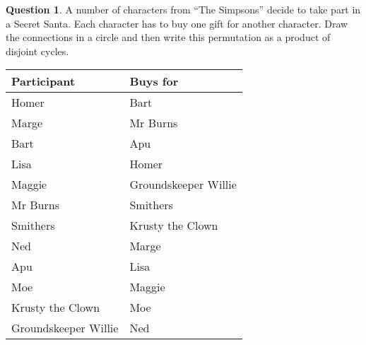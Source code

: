 \documentclass[a4paper,12pt]{article}
\theoremstyle{definition}
\newtheorem{question}{Question}%
\theoremstyle{remark}
\begin{document}
\begin{question}

A number of characters from ``The Simpsons'' decide to take part in a Secret Santa. Each character has to buy one gift for another character. Draw the connections in a circle and then write this permutation as a product of disjoint cycles. 
  \begin{table}[h]
\small
    \centering
    \begin{tabular}{|l |l|} \hline
      Participant & Buys for \\ \hline
      Homer &   Bart \\
      Marge & Mr Burns\\
      Bart & Apu\\
      Lisa & Homer\\
      Maggie & Groundskeeper Willie\\
      Mr Burns & Smithers\\
      Smithers & Krusty the Clown\\
      Ned & Marge\\
      Apu &  Lisa\\
      Moe & Maggie\\
      Krusty the Clown & Moe\\
      Groundskeeper Willie &  Ned\\ \hline
    \end{tabular}
  \end{table}
\end{question}





\end{document}
